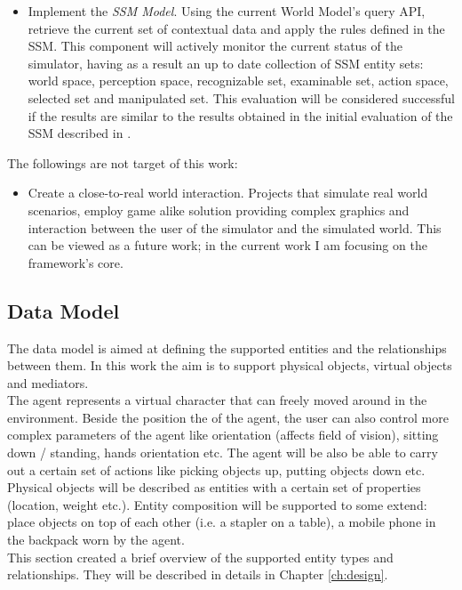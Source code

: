\begin{enumerate}
\begin{itemize}
			\item Implement the \emph{SSM Model}. Using the current World Model's query API, retrieve the current set of contextual data and apply the rules defined in the SSM. This component will actively monitor the current status of the simulator, having as a result an up to date collection of SSM entity sets: world space, perception space, recognizable set, examinable set, action space, selected set and manipulated set. This evaluation will be considered successful if the results are similar to the results obtained in the initial evaluation of the SSM described in \cite{pederson2011situative}.
		\end{itemize}
\end{enumerate}

The followings are not target of this work:
\begin{itemize}
	\item Create a close-to-real world interaction. Projects that simulate real world scenarios, employ game alike solution providing complex graphics and interaction between the user of the simulator and the simulated world. This can be viewed as a future work; in the current work I am focusing on the framework's core.
\end{itemize}

\subsection{Data Model}\label{sec:data_model}
The data model is aimed at defining the supported entities and the relationships between them. In this work the aim is to support physical objects, virtual objects and mediators.\\

The agent represents a virtual character that can freely moved around in the environment. Beside the position the of the agent, the user can also control more complex parameters of the agent like orientation (affects field of vision), sitting down / standing, hands orientation etc. The agent will be also be able to carry out a certain set of actions like picking objects up, putting objects down etc.\\

Physical objects will be described as entities with a certain set of properties (location, weight etc.). Entity composition will be supported to some extend: place objects on top of each other (i.e. a stapler on a table), a mobile phone in the backpack worn by the agent.\\

This section created a brief overview of the supported entity types and relationships. They will be described in details in Chapter \ref{ch:design}.
